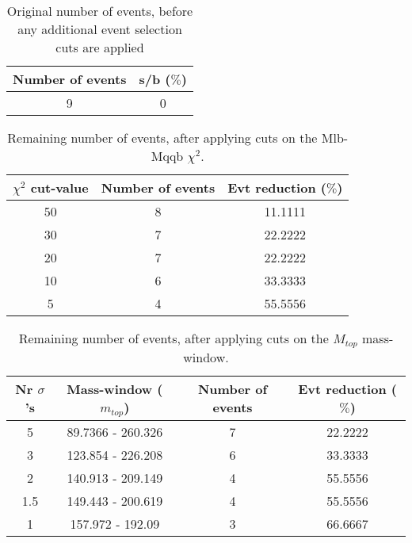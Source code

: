 \documentclass{article}
\begin{document}
 

 \begin{abstract} 
 
   The tables in this document represent the influence of the additional event selection cuts that were applied in order to reduce the number of selected events for CPU reasons. \\ 
   The considered cuts are rather basic and are merely developed to reduce the number of so-called wrong events \\ 
   \begin{itemize} 
     \item Cut on Mlb-Mqqb $\chi^{2}$ distribution 
     \item Cut on top and W-mass window 
   \end{itemize} 
 
   \textbf{Created on :} \today 
 \end{abstract} 
 
 \begin{table}[h!t] 
  \caption{Original number of events, before any additional event selection cuts are applied} 
  \centering 
   \begin{tabular}{c|c} 
     Number of events    & s/b ($\%$)     \\ 
     \hline
     9  & 0 
 
   \end{tabular} 
 \end{table} 
 
 \begin{table}[h!t] 
  \caption{Remaining number of events, after applying cuts on the Mlb-Mqqb $\chi^{2}$.} 
  \centering 
   \begin{tabular}{c|c|c|} 
     $\chi^{2}$ cut-value    & Number of events  & Evt reduction ($\%$)    \\ 
     \hline
     50  &   8  &  11.1111 \\ 
     30  &   7  &  22.2222 \\ 
     20  &   7  &  22.2222 \\ 
     10  &   6  &  33.3333 \\ 
     5  &   4  &  55.5556 \\ 
   \end{tabular} 
 \end{table} 
 
 \begin{table}[h!t] 
  \caption{Remaining number of events, after applying cuts on the $M_{top}$ mass-window.} 
  \centering 
   \begin{tabular}{c|c|c|c|}
     Nr $\sigma$'s & Mass-window ($m_{top}$)   & Number of events   & Evt reduction ($\%$)     \\
     \hline
     5 & 89.7366 - 260.326  &   7 &  22.2222 \\ 
     3 & 123.854 - 226.208  &   6 &  33.3333 \\ 
     2 & 140.913 - 209.149  &   4 &  55.5556 \\ 
     1.5 & 149.443 - 200.619  &   4 &  55.5556 \\ 
     1 & 157.972 - 192.09  &   3 &  66.6667 \\ 
   \end{tabular} 
 \end{table} 
 
\end{document}
